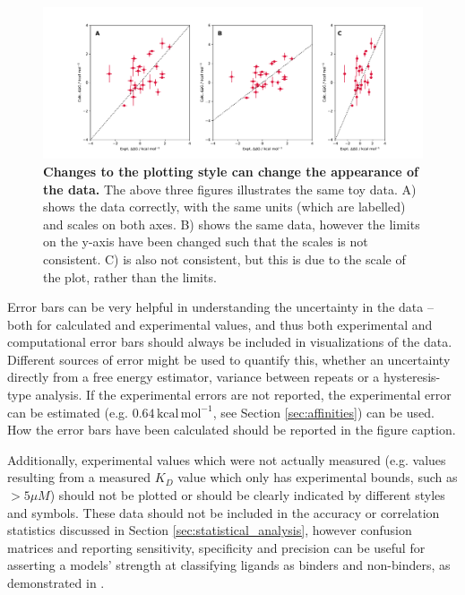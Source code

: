 \documentclass[9pt,bestpractices]{livecoms}
\begin{document}
\begin{figure}
    \includegraphics[width=0.95\linewidth]{figures/reporting/plotting-basics.pdf}
    \caption{\textbf{Changes to the plotting style can change the appearance of the data.} The above three figures illustrates the same toy data. A) shows the data correctly, with the same units (which are labelled) and scales on both axes. B) shows the same data, however the limits on the y-axis have been changed such that the scales is not consistent. C) is also not consistent, but this is due to the scale of the plot, rather than the limits.}
    \label{fig:plotting-basics}
\end{figure}

Error bars can be very helpful in understanding the uncertainty in the data -- both for calculated and experimental values, and thus both experimental and computational error bars should always be included in visualizations of the data. Different sources of error might be used to quantify this, whether an uncertainty directly from a free energy estimator, variance between repeats or a hysteresis-type analysis. If the experimental errors are not reported, the experimental error can be estimated (e.g. $0.64\,\mathrm{kcal\,mol^{-1}}$, see Section \ref{sec:affinities}) can be used. How the error bars have been calculated should be reported in the figure caption.


Additionally, experimental values which were not actually measured (e.g. values resulting from a measured $K_D$ value which only has experimental bounds, such as $> 5 \mu M$) should not be plotted or should be clearly indicated by different styles and symbols. These data should not be included in the accuracy or correlation statistics discussed in Section \ref{sec:statistical_analysis}, however confusion matrices and reporting sensitivity, specificity and precision can be useful for asserting a models' strength at classifying ligands as binders and non-binders, as demonstrated in \cite{hauserPredictingResistanceClinical2018}.
\end{document}
